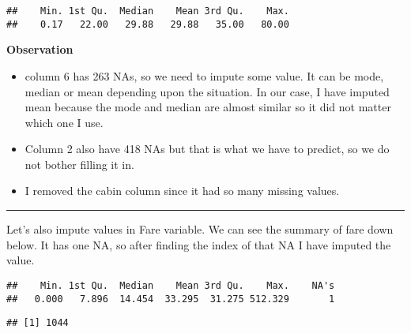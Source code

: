 \documentclass[]{article}
\newenvironment{Shaded}{\begin{snugshade}}{\end{snugshade}}
\newcommand{\KeywordTok}[1]{\textcolor[rgb]{0.13,0.29,0.53}{\textbf{#1}}}
\newcommand{\DataTypeTok}[1]{\textcolor[rgb]{0.13,0.29,0.53}{#1}}
\newcommand{\DecValTok}[1]{\textcolor[rgb]{0.00,0.00,0.81}{#1}}
\newcommand{\StringTok}[1]{\textcolor[rgb]{0.31,0.60,0.02}{#1}}
\newcommand{\OtherTok}[1]{\textcolor[rgb]{0.56,0.35,0.01}{#1}}
\newcommand{\OperatorTok}[1]{\textcolor[rgb]{0.81,0.36,0.00}{\textbf{#1}}}
\newcommand{\NormalTok}[1]{#1}
\begin{document}
\begin{verbatim}
##    Min. 1st Qu.  Median    Mean 3rd Qu.    Max. 
##    0.17   22.00   29.88   29.88   35.00   80.00
\end{verbatim}

\textbf{Observation}

\begin{itemize}
\item
  column 6 has 263 NAs, so we need to impute some value. It can be mode,
  median or mean depending upon the situation. In our case, I have
  imputed mean because the mode and median are almost similar so it did
  not matter which one I use.
\item
  Column 2 also have 418 NAs but that is what we have to predict, so we
  do not bother filling it in.
\item
  I removed the cabin column since it had so many missing values.
\end{itemize}

\begin{center}\rule{0.5\linewidth}{\linethickness}\end{center}

Let's also impute values in Fare variable. We can see the summary of
fare down below. It has one NA, so after finding the index of that NA I
have imputed the value.

\begin{Shaded}
\end{Shaded}

\begin{verbatim}
##    Min. 1st Qu.  Median    Mean 3rd Qu.    Max.    NA's 
##   0.000   7.896  14.454  33.295  31.275 512.329       1
\end{verbatim}

\begin{Shaded}
\end{Shaded}

\begin{verbatim}
## [1] 1044
\end{verbatim}

\begin{Shaded}
\end{Shaded}
\end{document}
